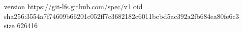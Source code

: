 version https://git-lfs.github.com/spec/v1
oid sha256:3554a7f74609b66201c052ff7c3682182c6011bcbd5ac392a2fb684ea80fe6c3
size 626416
